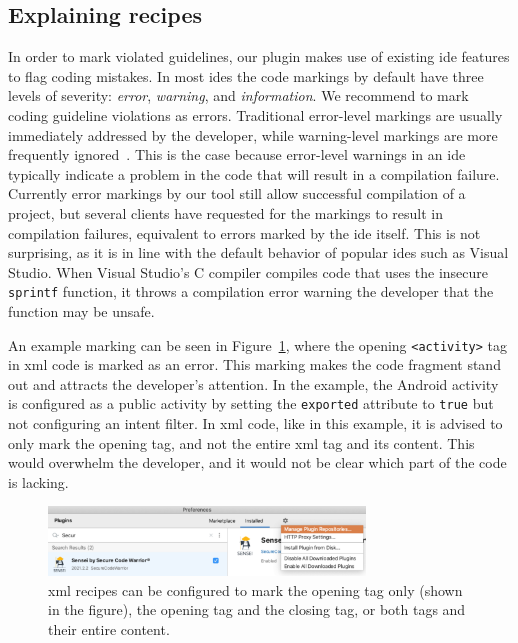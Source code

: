 \subsection{Explaining recipes}
\label{sec:information}
In order to mark violated guidelines, our plugin makes use of existing \gls{ide} features to flag coding mistakes.
In most \glspl{ide} the code markings by default have three levels of severity: \emph{error}, \emph{warning}, and \emph{information}.
We recommend to mark coding guideline violations as errors.
Traditional error-level markings are usually immediately addressed by the developer, while warning-level markings are more frequently ignored~\cite{whitney2018embedding}.
This is the case because error-level warnings in an \gls{ide} typically indicate a problem in the code that will result in a compilation failure.
Currently error markings by our tool still allow successful compilation of a project, but several clients have requested for the markings to result in compilation failures, equivalent to errors marked by the \gls{ide} itself.
This is not surprising, as it is in line with the default behavior of popular \glspl{ide} such as Visual Studio.
When Visual Studio's C compiler compiles code that uses the insecure \texttt{sprintf} function, it throws a compilation error warning the developer that the function may be unsafe.

An example marking can be seen in Figure~\ref{fig:publicactivity}, where the opening \texttt{<activity>} tag in \gls{xml} code is marked as an error.
This marking makes the code fragment stand out and attracts the developer's attention.
In the example, the Android activity is configured as a public activity by setting the \texttt{exported} attribute to \texttt{true} but not configuring an intent filter.
In \gls{xml} code, like in this example, it is advised to only mark the opening tag, and not the entire \gls{xml} tag and its content.
This would overwhelm the developer, and it would not be clear which part of the code is lacking. 

\begin{figure}
  \centering
  \includegraphics[width=0.75\textwidth,page=3]{04-tools/figures/figures2.pdf}
  \caption[Error marking on an XML opening tag.]{\Gls{xml} recipes can be configured to mark the opening tag only (shown in the figure), the opening tag and the closing tag, or both tags and their entire content.}
  \label{fig:publicactivity} 
\end{figure}

